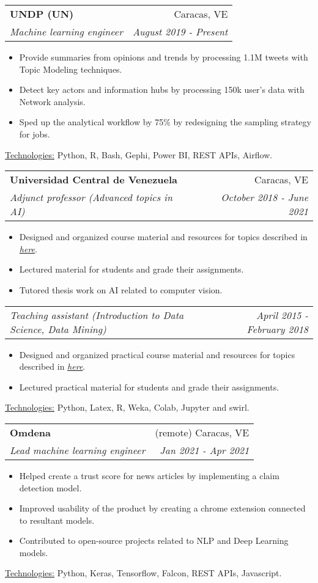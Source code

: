 \documentclass[letterpaper,11pt]{article}
\makeatletter
\newcommand{\sepsection}{\vspace{25pt}}
\newcommand{\resumeItem}[1]{%
  \item\small{
    #1
  }
}
\newcommand{\resumeSubheading}[4]{
  \vspace{8pt}\item%
    \begin{tabular*}{0.97\textwidth}[t]{l@{\extracolsep{\fill}}r}
      \textbf{#1} & #2 \\
      \textit{\small#3} & \textit{\small #4} \\
    \end{tabular*}\vspace{-5pt}
}
\newcommand{\resumeSubSubheading}[2]{
    \vspace{1pt}
    \begin{tabular*}{0.97\textwidth}{l@{\extracolsep{\fill}}r}
      \textit{\small#1} & \textit{\small #2} \\
    \end{tabular*}\vspace{-5pt}
}
\newcommand{\resumeItemListStart}{\begin{itemize}}
\newcommand{\resumeItemListEnd}{\end{itemize}\vspace{-5pt}}
\newcommand{\resumeTech}[2]{
 \underline{#1:} #2
}
\makeatother
\begin{document}
    \sepsection

    \resumeSubheading
      {UNDP (UN)}{Caracas, VE}
      {Machine learning engineer}{August 2019 - Present}
      \resumeItemListStart
      \resumeItem{Provide summaries from opinions and trends by processing 1.1M tweets with Topic Modeling techniques.}
      \resumeItem{Detect key actors and information hubs by processing 150k user's data with Network analysis.}
      \resumeItem{Sped up the analytical workflow by 75\% by redesigning the sampling strategy for jobs.}
      \resumeItemListEnd
      \resumeTech{Technologies}{Python, R, Bash, Gephi, Power BI, REST APIs, Airflow.}\\
    
    \sepsection

    \resumeSubheading
      {Universidad Central de Venezuela}{Caracas, VE}
      {Adjunct professor (Advanced topics in AI)}{October 2018 - June 2021}
      \resumeItemListStart
      \resumeItem{Designed and organized course material and resources for topics described in \href{https://bit.ly/2VYchte}{\textsl{here}}.}
      \resumeItem{Lectured material for students and grade their assignments.}
      \resumeItem{Tutored thesis work on AI related to computer vision.}
      \resumeItemListEnd
    \resumeSubSubheading
      {Teaching assistant (Introduction to Data Science, Data Mining)}{April 2015 - February 2018}
     \resumeItemListStart
      \resumeItem{Designed and organized practical course material and resources for topics described in \href{https://bit.ly/2VYchte}{\textsl{here}}.}
      \resumeItem{Lectured practical material for students and grade their assignments.}
      \resumeItemListEnd
      \resumeTech{Technologies}{Python, Latex, R, Weka, Colab, Jupyter and swirl.}\\

    \sepsection
    
    \resumeSubheading
      {Omdena}{(remote) Caracas, VE}
      {Lead machine learning engineer}{Jan 2021 - Apr 2021}
      \resumeItemListStart
      \resumeItem{Helped create a trust score for news articles by implementing a claim detection model.}
      \resumeItem{Improved usability of the product by creating a chrome extension connected to resultant models.}
      \resumeItem{Contributed to open-source projects related to NLP and Deep Learning models.}
      \resumeItemListEnd
      \resumeTech{Technologies}{Python, Keras, Tensorflow, Falcon, REST APIs, Javascript.}\\
\end{document}
